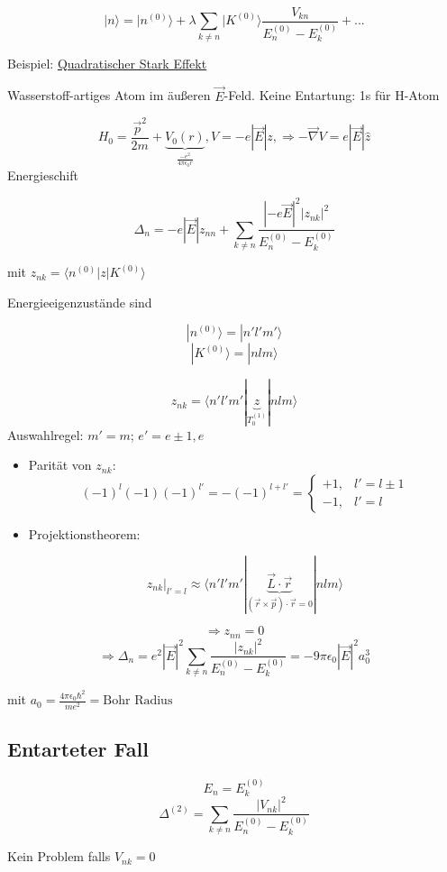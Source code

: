 \[ |n\rangle = |n^{(0)}\rangle + \lambda \sum_{k\neq
  n}|K^{(0)}\rangle \frac{V_{kn}}{E^{(0)}_n-E^{(0)}_k}+...\]

Beispiel: \underline{Quadratischer Stark Effekt}

Wasserstoff-artiges Atom im äußeren \(\vec E\)-Feld. Keine Entartung: 1s für H-Atom

\[ H_0 = \frac{\vec p^2}{2m} +\underbrace{V_0(r)}_{\frac{-e^2}{4\pi
    \epsilon_0 r}}, V = -e|\vec E|z, \Rightarrow -\vec \nabla V = e|\vec E|\hat z \] Energieschift

\[ \Delta_n = -e|\vec E| z_{nn} + \sum_{k\neq
  n} \frac{|-e\vec E|^2|z_{nk}|^2}{E^{(0)}_n-E^{(0)}_k}\]

mit \(z_{nk}=\langle n^{(0)} | z | K^{(0)} \rangle\)

Energieeigenzustände sind

\[ |n^{(0)}\rangle = |n'l'm'\rangle\]
\[ |K^{(0)}\rangle = |nlm\rangle\]

\[ z_{nk} = \langle n'l'm'|\underbrace{z}_{T^{(1)}_0}| nlm\rangle\]
Auswahlregel: \(m'=m\); \(e' = e\pm 1,e\)

\begin{itemize}
\item Parität von \(z_{nk}\):
\[(-1)^l(-1)(-1)^{l'}=-(-1)^{l+l'}= \begin{cases}
  +1,  & l'=l\pm1 \\
  -1, & l'=l
\end{cases}\]
\item Projektionstheorem:

\[ \left. z_{nk}\right |_{l'=l}\approx \langle n'l'm'|\underbrace{\vec L \cdot
  \vec r}_{(\vec r \times \vec p)\cdot \vec r = 0}| nlm\rangle\]


\end{itemize}


\[ \Rightarrow z_{nn} = 0\]
\[\Rightarrow \Delta_n = e^2|\vec E|^2 \sum_{k\neq
  n} \frac{|z_{nk}|^2}{E^{(0)}_n-E^{(0)}_k} = -9\pi \epsilon_0 |\vec E|^2 a^3_0 \]

mit \(a_0 = \frac{4\pi \epsilon_0 \hbar^2}{me^2}=\text{Bohr Radius}\)
 

\subsection{Entarteter Fall}

\[ E_n= E^{(0)}_k \]
\[\Delta^{(2)} =  \sum_{k\neq
  n} \frac{|V_{nk}|^2}{E^{(0)}_n-E^{(0)}_k}\]

Kein Problem falls \(V_{nk} = 0\)

